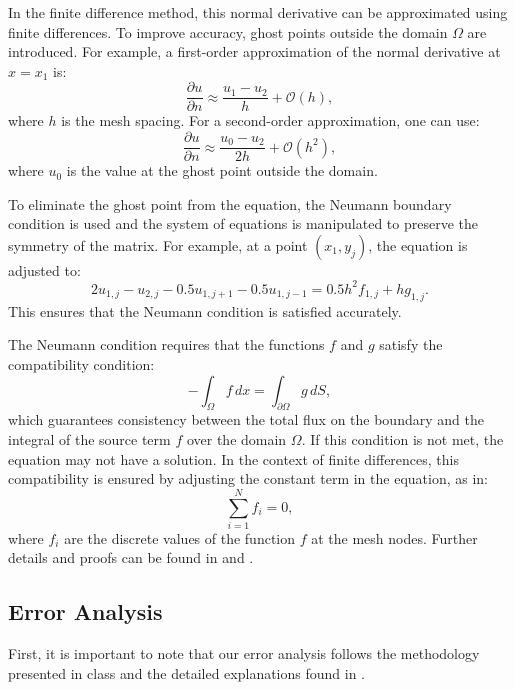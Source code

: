 \documentclass[aps,amsmath,amssymb,floatfix]{revtex4}
\begin{document}
In the finite difference method, this normal derivative can be approximated using finite differences. To improve accuracy, ghost points outside the domain $\Omega$ are introduced. For example, a first-order approximation of the normal derivative at $x = x_1$ is:
\begin{equation*}
	\frac{\partial u}{\partial n} \approx \frac{u_1 - u_2}{h} + \mathcal{O}(h),
\end{equation*}
where $h$ is the mesh spacing. For a second-order approximation, one can use:
\begin{equation*}
	\frac{\partial u}{\partial n} \approx \frac{u_0 - u_2}{2h} + \mathcal{O}(h^2),
\end{equation*}
where $u_0$ is the value at the ghost point outside the domain.

To eliminate the ghost point from the equation, the Neumann boundary condition is used and the system of equations is manipulated to preserve the symmetry of the matrix. For example, at a point $(x_1, y_j)$, the equation is adjusted to:
\begin{equation*}
	2u_{1,j} - u_{2,j} - 0.5u_{1,j+1} - 0.5u_{1,j-1} = 0.5h^2 f_{1,j} + h g_{1,j}.
\end{equation*}
This ensures that the Neumann condition is satisfied accurately.

The Neumann condition requires that the functions $f$ and $g$ satisfy the compatibility condition:
\begin{equation*}
	-\int_\Omega f \, dx = \int_{\partial \Omega} g \, dS,
\end{equation*}
which guarantees consistency between the total flux on the boundary and the integral of the source term $f$ over the domain $\Omega$. If this condition is not met, the equation may not have a solution. In the context of finite differences, this compatibility is ensured by adjusting the constant term in the equation, as in:
\begin{equation*}
	\sum_{i=1}^{N} f_i = 0,
\end{equation*}
where $f_i$ are the discrete values of the function $f$ at the mesh nodes. Further details and proofs can be found in \cite{Chen2014} and \cite{Butler2021}.


        
\subsection{Error Analysis}
First, it is important to note that our error analysis follows the methodology presented in class \cite{Kuhl2024} and the detailed explanations found in \cite{Chen2014}.
\end{document}
